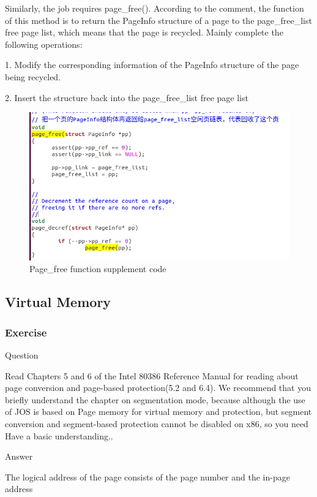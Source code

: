 Similarly, the job requires page\_free(). According to the comment, the function of this method is to return the PageInfo structure of a page to the page\_free\_list free page list, which means that the page is recycled. Mainly complete the following operations:

1. Modify the corresponding information of the PageInfo structure of the page being recycled.

2. Insert the structure back into the page\_free\_list free page list
\begin{figure}[H]
\centering
\includegraphics[width=0.8\linewidth]{figure/page_free_changed}
\caption{Page\_free function supplement code}
\end{figure}
\subsection{Virtual Memory}
\subsubsection{Exercise }
\begin{flushleft}
{\Large Question}
\end{flushleft}

Read Chapters 5 and 6 of the Intel 80386 Reference Manual for reading about page conversion and page-based protection(5.2 and 6.4). We recommend that you briefly understand the chapter on segmentation mode, because although the use of JOS is based on
Page memory for virtual memory and protection, but segment conversion and segment-based protection cannot be disabled on x86, so you need
Have a basic understanding..

\begin{flushleft}
{\Large Answer}
\end{flushleft}

The logical address of the page consists of the page number and the in-page address

